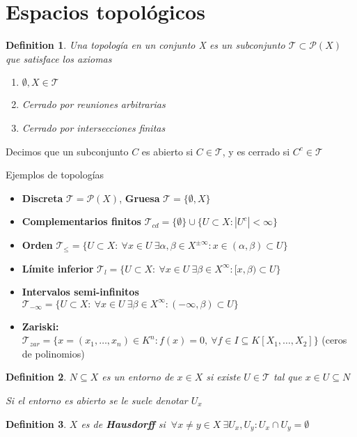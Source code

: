 \documentclass[leqno]{article}
\newtheorem*{definition}{Definition}
\begin{document}
\section{Espacios topológicos}
\begin{definition}
Una topología en un conjunto X es un subconjunto $\mathcal{T} \subset \mathcal{P}(X)$ que satisface los axiomas
\begin{enumerate}[topsep=-6pt, itemsep=0pt]
  \item $\emptyset, X \in \mathcal{T} $
  \item Cerrado por reuniones arbitrarias
  \item Cerrado por intersecciones finitas
\end{enumerate}
\end{definition}
Decimos que un subconjunto $C$ es abierto si $C\in\mathcal{T}$, y es cerrado si $C^c \in  \mathcal{T}$

Ejemplos de topologías
\begin{itemize}[topsep=-6pt, itemsep=0pt]
  \item \textbf{Discreta} $\mathcal{T} = \mathcal{P}(X)$,  \textbf{Gruesa} $\mathcal{T}=\{\emptyset, X\}$
  \item \textbf{Complementarios finitos} $\mathcal{T}_{cd} = \{\emptyset\}\cup \{U \subset X : |U^c|<\infty\}$
  \item \textbf{Orden} $\mathcal{T}_{\le } = \{U\subset X: \ \forall  x \in U \ \exists \alpha , \beta \in X^{\pm \infty} : x\in (\alpha , \beta)\subset U\}$
  \item \textbf{Límite inferior} $\mathcal{T}_l = \{U\subset X : \ \forall  x\in U \ \exists \beta \in X^\infty  : [x, \beta )\subset  U\}$
  \item \textbf{Intervalos semi-infinitos} $\mathcal{T}_{-\infty}= \{U\subset X : \ \forall  x\in U \ \exists \beta \in X^\infty  : (-\infty, \beta )\subset  U\}$
  \item \textbf{Zariski:} $\mathcal{T}_{zar} = \{x = (x_1, \ldots, x_n)\in K^n : f(x)=0, \ \forall f\in I\subseteq K[X_1, \ldots, X_2]\}$ (ceros de polinomios)
\end{itemize}

\begin{definition}
$N\subseteq X$ es un entorno de $x\in X$ si existe $U\in \mathcal{T}$ tal que $x\in U \subseteq  N$

Si el entorno es abierto se le suele denotar $U_x$
\end{definition}

\begin{definition}
$X$ es de \textbf{Hausdorff} si $\ \forall x\neq y \in X \ \exists U_x, U_y : U_x\cap U_y =\emptyset$
\end{definition}
\end{document}
